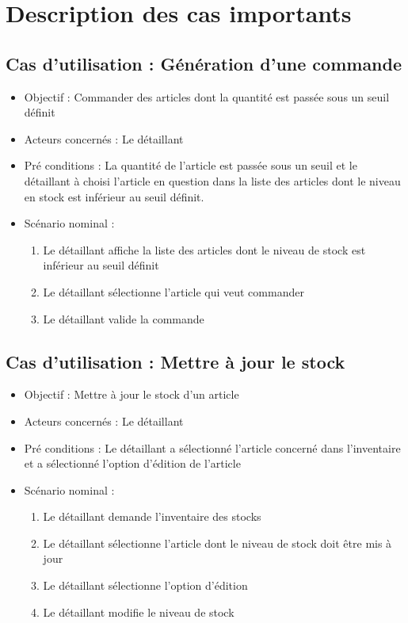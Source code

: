 \section{Description des cas importants}

\subsection{Cas d'utilisation : Génération d'une commande}
\begin{itemize}
	\item Objectif : Commander des articles dont la quantité est passée sous un seuil définit
	\item Acteurs concernés : Le détaillant
	\item Pré conditions : La quantité de l'article est passée sous un seuil et le détaillant à choisi l'article en question dans la liste des articles dont le niveau en stock est inférieur au seuil définit.
	\item Scénario nominal :
		\begin{enumerate}
			\item Le détaillant affiche la liste des articles dont le niveau de stock est inférieur au seuil définit
			\item Le détaillant sélectionne l'article qui veut commander
			\item Le détaillant valide la commande
		\end{enumerate}
\end{itemize}

\subsection{Cas d'utilisation : Mettre à jour le stock}
\begin{itemize}
	\item Objectif : Mettre à jour le stock d'un article
	\item Acteurs concernés : Le détaillant
	\item Pré conditions : Le détaillant a sélectionné l'article concerné dans l'inventaire et a sélectionné l'option d'édition de l'article
	\item Scénario nominal :
	\begin{enumerate}
		\item Le détaillant demande l'inventaire des stocks
		\item Le détaillant sélectionne l'article dont le niveau de stock doit être mis à jour
		\item Le détaillant sélectionne l'option d'édition
		\item Le détaillant modifie le niveau de stock
	\end{enumerate}
\end{itemize}


